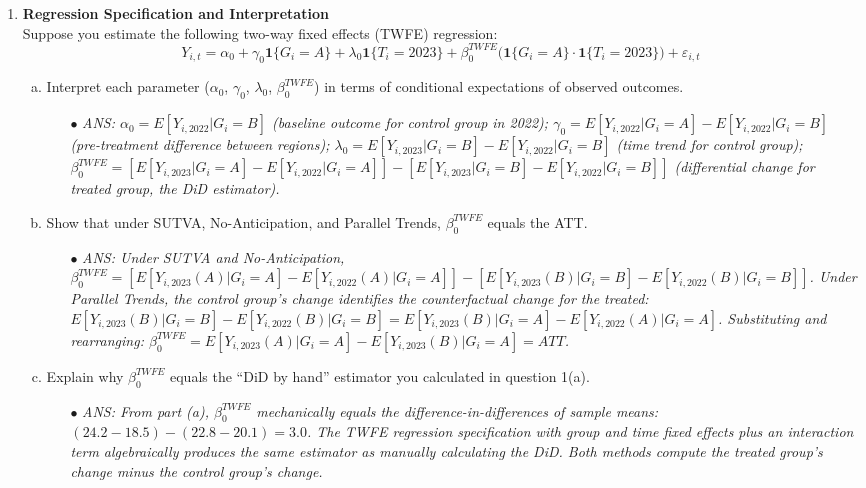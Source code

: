 \documentclass[12pt,a4paper]{article}
\newcommand{\ans}[1]{\begin{itemize}\item[$\bullet$] \textit{ANS: #1}\end{itemize}}
\begin{document}
\begin{enumerate}
\item \textbf{Regression Specification and Interpretation}\\
Suppose you estimate the following two-way fixed effects (TWFE) regression:
\begin{equation*}
Y_{i,t} = \alpha_{0}+\gamma_{0}\mathbf{1}\{G_i = A\}+\lambda_{0}\mathbf{1}\{T_i = 2023\}+\beta_{0}^{TWFE}\big(\mathbf{1}\{G_i = A\}\cdot\mathbf{1}\{T_i = 2023\}\big)+\varepsilon_{i,t}
\end{equation*}
\begin{enumerate}[(a)]
\item Interpret each parameter ($\alpha_{0}$, $\gamma_{0}$, $\lambda_{0}$, $\beta_{0}^{TWFE}$) in terms of conditional expectations of observed outcomes.
\ans{$\alpha_{0} = E[Y_{i,2022}|G_i = B]$ (baseline outcome for control group in 2022); $\gamma_{0} = E[Y_{i,2022}|G_i = A] - E[Y_{i,2022}|G_i = B]$ (pre-treatment difference between regions); $\lambda_{0} = E[Y_{i,2023}|G_i = B] - E[Y_{i,2022}|G_i = B]$ (time trend for control group); $\beta_{0}^{TWFE} = [E[Y_{i,2023}|G_i = A] - E[Y_{i,2022}|G_i = A]] - [E[Y_{i,2023}|G_i = B] - E[Y_{i,2022}|G_i = B]]$ (differential change for treated group, the DiD estimator).}

\item Show that under SUTVA, No-Anticipation, and Parallel Trends, $\beta_{0}^{TWFE}$ equals the ATT.
\ans{Under SUTVA and No-Anticipation, $\beta_{0}^{TWFE} = [E[Y_{i,2023}(A)|G_i = A] - E[Y_{i,2022}(A)|G_i = A]] - [E[Y_{i,2023}(B)|G_i = B] - E[Y_{i,2022}(B)|G_i = B]]$. Under Parallel Trends, the control group's change identifies the counterfactual change for the treated: $E[Y_{i,2023}(B)|G_i = B]-E[Y_{i,2022}(B)|G_i = B] = E[Y_{i,2023}(B)|G_i = A] - E[Y_{i,2022}(A)|G_i = A]$. Substituting and rearranging: $\beta_{0}^{TWFE} = E[Y_{i,2023}(A)|G_i = A] - E[Y_{i,2023}(B)|G_i = A] = ATT$.}

\item Explain why $\beta_{0}^{TWFE}$ equals the ``DiD by hand'' estimator you calculated in question 1(a).
\ans{From part (a), $\beta_{0}^{TWFE}$ mechanically equals the difference-in-differences of sample means: $(24.2 - 18.5) - (22.8 - 20.1) = 3.0$. The TWFE regression specification with group and time fixed effects plus an interaction term algebraically produces the same estimator as manually calculating the DiD. Both methods compute the treated group's change minus the control group's change.}
\end{enumerate}

\end{enumerate}
\end{document}
